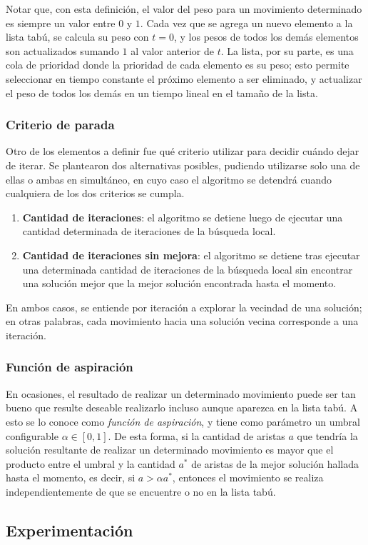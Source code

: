 Notar que, con esta definición, el valor del peso para un movimiento
determinado es siempre un valor entre $0$ y $1$. Cada vez que se agrega un
nuevo elemento a la lista tabú, se calcula su peso con $t = 0$, y los pesos de
todos los demás elementos son actualizados sumando $1$ al valor anterior de
$t$. La lista, por su parte, es una cola de prioridad donde la prioridad de
cada elemento es su peso; esto permite seleccionar en tiempo constante el
próximo elemento a ser eliminado, y actualizar el peso de todos los demás en
un tiempo lineal en el tamaño de la lista.

\subsubsection{Criterio de parada}
Otro de los elementos a definir fue qué criterio utilizar para decidir cuándo
dejar de iterar. Se plantearon dos alternativas posibles, pudiendo utilizarse
solo una de ellas o ambas en simultáneo, en cuyo caso el algoritmo se detendrá
cuando cualquiera de los dos criterios se cumpla.

\begin{enumerate}
    \item \textbf{Cantidad de iteraciones}: el algoritmo se detiene luego de
    ejecutar una cantidad determinada de iteraciones de la búsqueda local.
    \item \textbf{Cantidad de iteraciones sin mejora}: el algoritmo se detiene
    tras ejecutar una determinada cantidad de iteraciones de la búsqueda local
    sin encontrar una solución mejor que la mejor solución encontrada hasta el
    momento.
\end{enumerate}

En ambos casos, se entiende por iteración a explorar la vecindad de una
solución; en otras palabras, cada movimiento hacia una solución vecina
corresponde a una iteración.

\subsubsection{Función de aspiración}
En ocasiones, el resultado de realizar un determinado movimiento puede ser tan
bueno que resulte deseable realizarlo incluso aunque aparezca en la lista
tabú. A esto se lo conoce como \emph{función de aspiración}, y tiene como
parámetro un umbral configurable $\alpha \in [0, 1]$. De esta forma, si la
cantidad de aristas $a$ que tendría la solución resultante de realizar un
determinado movimiento es mayor que el producto entre el umbral y la cantidad
$a^*$ de aristas de la mejor solución hallada hasta el momento, es decir, si
$a > \alpha a^*$, entonces el movimiento se realiza independientemente de que
se encuentre o no en la lista tabú.

\subsection{Experimentación}
